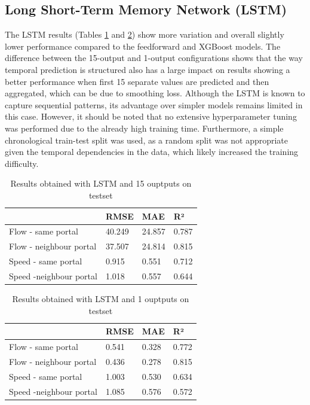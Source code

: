 	\subsection{Long Short-Term Memory Network (LSTM)}
	The LSTM results (Tables \ref{tab:result_LSTM_15output} and \ref{tab:result_LSTM_1output}) show more variation and overall slightly lower performance compared to the feedforward and XGBoost models.
	The difference between the 15-output and 1-output configurations shows that the way temporal prediction is structured also has a large impact on results showing a better performance when first 15 separate values are predicted and then aggregated, which can be due to smoothing loss.
	Although the LSTM is known to capture sequential patterns, its advantage over simpler models remains limited in this case. However, it should be noted that no extensive hyperparameter tuning was performed due to the already high training time. Furthermore, a simple chronological train-test split was used, as a random split was not appropriate given the temporal dependencies in the data, which likely increased the training difficulty.
	\begin{table}[H]
		\centering
		\caption{Results obtained with LSTM and 15 ouptputs on testset}
		\label{tab:result_LSTM_15output}
		\begin{tabular}{l|lll}
			& RMSE   & MAE    & R²    \\
			\hline
			Flow - same portal      &40.249& 24.857 & 0.787 \\
			Flow - neighbour portal &  37.507 & 24.814 & 0.815 \\
			Speed - same portal     &  0.915&0.551& 0.712 \\
			Speed -neighbour portal & 1.018 & 0.557 & 0.644
		\end{tabular}
	\end{table}
	\begin{table}[H]
		\centering
		\caption{Results obtained with LSTM and 1 ouptputs on testset}
		\label{tab:result_LSTM_1output}
		\begin{tabular}{l|lll}
			& RMSE   & MAE    & R²    \\
			\hline
			Flow - same portal      &0.541& 0.328& 0.772 \\
			Flow - neighbour portal &  0.436 & 0.278&0.815 \\
			Speed - same portal     & 1.003& 0.530 & 0.634 \\
			Speed -neighbour portal & 1.085 & 0.576 & 0.572
		\end{tabular}
	\end{table}

